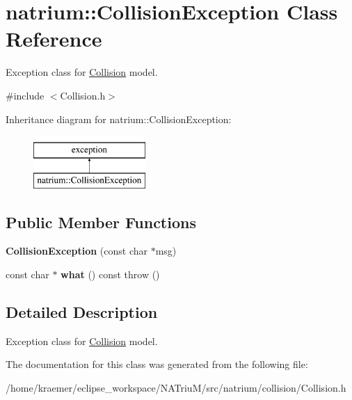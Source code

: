 \hypertarget{classnatrium_1_1CollisionException}{\section{natrium\-:\-:Collision\-Exception Class Reference}
\label{classnatrium_1_1CollisionException}
}


Exception class for \hyperlink{classnatrium_1_1Collision}{Collision} model.  




{\ttfamily \#include $<$Collision.\-h$>$}

Inheritance diagram for natrium\-:\-:Collision\-Exception\-:\begin{figure}[H]
\begin{center}
\leavevmode
\includegraphics[height=2.000000cm]{classnatrium_1_1CollisionException}
\end{center}
\end{figure}
\subsection*{Public Member Functions}
\begin{DoxyCompactItemize}
\item 
\hypertarget{classnatrium_1_1CollisionException_aee60989a43066bd65b0481cde4d96980}{{\bfseries Collision\-Exception} (const char $\ast$msg)}\label{classnatrium_1_1CollisionException_aee60989a43066bd65b0481cde4d96980}

\item 
\hypertarget{classnatrium_1_1CollisionException_a700f9ee10ef668a35cb227d8a7b01d4c}{const char $\ast$ {\bfseries what} () const   throw ()}\label{classnatrium_1_1CollisionException_a700f9ee10ef668a35cb227d8a7b01d4c}

\end{DoxyCompactItemize}


\subsection{Detailed Description}
Exception class for \hyperlink{classnatrium_1_1Collision}{Collision} model. 

The documentation for this class was generated from the following file\-:\begin{DoxyCompactItemize}
\item 
/home/kraemer/eclipse\-\_\-workspace/\-N\-A\-Triu\-M/src/natrium/collision/Collision.\-h\end{DoxyCompactItemize}
